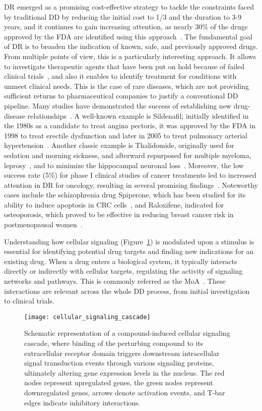 \gls{DR} emerged as a promising cost-effective strategy to tackle the constraints faced by traditional \gls{DD} by reducing the initial cost to 1/3 and the duration to 3-9 years, and it continues to gain increasing attention, as nearly 30\% of the drugs approved by the FDA are identified using this approach~\cite{RN54,RN64}. 
The fundamental goal of \gls{DR} is to broaden the indication of known, safe, and previously approved drugs. 
From multiple points of view, this is a particularly interesting approach. 
It allows to investigate therapeutic agents that have been put on hold because of failed clinical trials~\cite{RN62}, and also it enables to identify treatment for conditions with unmeet clinical needs. 
This is the case of rare diseases, which are not providing sufficient returns to pharmaceutical companies to justify a conventional DD pipeline. 
Many studies have demonstrated the success of establishing new drug-disease relationships~\cite{RN48}. 
A well-known example is Sildenafil; initially identified in the 1980s as a candidate to treat angina pectoris, it was approved by the \gls{FDA} in 1998 to treat erectile dysfunction and later in 2005 to treat pulmonary arterial hypertension~\cite{RN54, RN64, RN94}. 
Another classic example is Thalidomide, originally used for sedation and morning sickness, and afterward repurposed for multiple myeloma, leprosy~\cite{RN54, RN64}, and to minimize the hippocampal neuronal loss~\cite{RN50}. Moreover, the low success rate (5\%) for phase I clinical studies of cancer treatments led to increased attention in DR for oncology, resulting in several promising findings~\cite{RN64, RN63}. 
Noteworthy cases include the schizophrenia drug Spiperone, which has been studied for its ability to induce apoptosis in \gls{CRC} cells~\cite{RN51}, and Raloxifene, indicated for osteoporosis, which proved to be effective in reducing breast cancer risk in postmenopausal women~\cite{RN64, RN61}.

Understanding how cellular signaling (Figure~\ref{fig:cellular_signaling_cascade}) is modulated upon a stimulus is essential for identifying potential drug targets and finding new indications for an existing drug. 
When a drug enters a biological system, it typically interacts directly or indirectly with cellular targets, regulating the activity of signaling networks and pathways. 
This is commonly referred as the \gls{MoA}~\cite{RN52, RN53}. These interactions are relevant across the whole \gls{DD} process, from initial investigation to clinical trials. 

\begin{figure}[htbp]
    \centering
    \texttt{[image: cellular\_signaling\_cascade]}
    \caption{Schematic representation of a compound-induced cellular signaling cascade, where binding of the perturbing compound to its extracellular receptor domain triggers downstream intracellular signal transduction events through various signaling proteins, ultimately altering gene expression levels in the nucleus. The red nodes represent upregulated genes, the green nodes represent downregulated genes, arrows denote activation events, and T-bar edges indicate inhibitory interactions.}
    \label{fig:cellular_signaling_cascade}
\end{figure}


